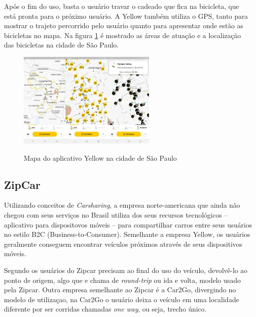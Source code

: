 Após o fim do uso, basta o usuário travar o cadeado que fica na bicicleta, que está pronta para o próximo usuário. A Yellow também utiliza o GPS, tanto para mostrar o trajeto percorrido pelo usuário quanto para apresentar onde estão as bicicletas no mapa. Na figura \ref{fig:yellow-app} é mostrado as áreas de atuação e a localização das bicicletas na cidade de São Paulo.

\begin{figure}[!hbtp]
	\centering
	\caption{Mapa do aplicativo Yellow na cidade de São Paulo}
	\includegraphics[width=0.6\textwidth]{./04-figuras/yellow/yellow.png}
	\label{fig:yellow-app}
\end{figure}

\subsection{ZipCar}

Utilizando conceitos de \textit{Carsharing}, a empresa norte-americana que ainda não chegou com seus serviços no Brasil utiliza dos seus recursos tecnológicos -- aplicativo para dispositovos móveis -- para compartilhar carros entre seus usuários no estilo B2C (Business-to-Consumer). Semelhante a empresa Yellow, os usuários geralmente conseguem encontrar veículos próximos através de seus dispositivos móveis.

Segundo \cite{ballus-armet} os usuários do Zipcar precisam ao final do uso do veículo, devolvê-lo ao ponto de origem, algo que e chama de \textit{round-trip} ou ida e volta, modelo usado pela Zipcar. Outra empresa semelhante ao Zipcar é a Car2Go, divergindo no modelo de utilizaçao, na Car2Go o usuário deixa o veículo em uma localidade diferente por ser corridas chamadas \textit{one way}, ou seja, trecho único.

